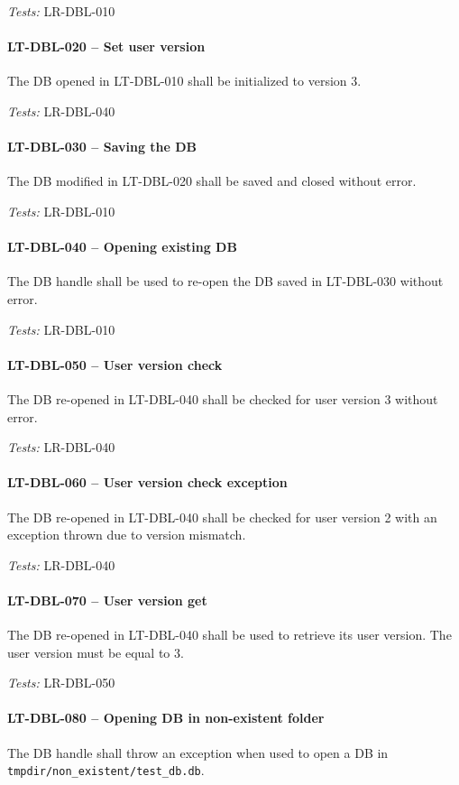 \textit{Tests: } LR-DBL-010

\paragraph{LT-DBL-020 -- Set user version}
The DB opened in LT-DBL-010 shall be initialized to version 3.

\textit{Tests: } LR-DBL-040

\paragraph{LT-DBL-030 -- Saving the DB}
The DB modified in LT-DBL-020 shall be saved and closed without error.

\textit{Tests: } LR-DBL-010

\paragraph{LT-DBL-040 -- Opening existing DB}
The DB handle shall be used to re-open the DB saved in LT-DBL-030
without error.

\textit{Tests: } LR-DBL-010

\paragraph{LT-DBL-050 -- User version check}
The DB re-opened in LT-DBL-040 shall be checked for user version 3
without error.

\textit{Tests: } LR-DBL-040

\paragraph{LT-DBL-060 -- User version check exception}
The DB re-opened in LT-DBL-040 shall be checked for user version 2
with an exception thrown due to version mismatch.

\textit{Tests: } LR-DBL-040

\paragraph{LT-DBL-070 -- User version get}
The DB re-opened in LT-DBL-040 shall be used to retrieve its user
version. The user version must be equal to 3.

\textit{Tests: } LR-DBL-050

\paragraph{LT-DBL-080 -- Opening DB in non-existent folder}
The DB handle shall throw an exception when used to open
a DB in \lstinline{tmpdir/non_existent/test_db.db}.

